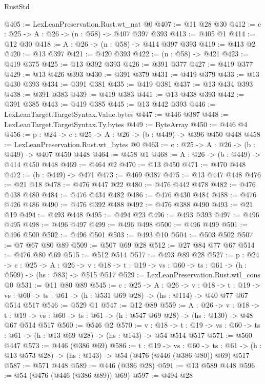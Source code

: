 \begin{lexlean}{RustStd}
\begin{coremodule}
{\begin{coremodule}
{{{{{{{{{{{{{{{{{{{{{{{{{{{{{{{{{{{{{{@405 := LexLeanPreservation.Rust.wt_nat @0
@407 := @11 @28 @30
@412 := {c : @25} -> {A : @26} -> (n : @58) -> @407 @397 @393
@413 := @405 @1
@414 := @12 @30
@418 := {A : @26} -> (n : @58) -> @414 @397 @393
@419 := @413 @2
@420 := @13 @397
@421 := @420 @393
@422 := (n : @58) -> @421
@423 := @419 @375
@425 := @13 @392 @393
@426 := @391 @377
@427 := @419 @377
@429 := @13 @426 @393
@430 := @391 @379
@431 := @419 @379
@433 := @13 @430 @393
@434 := @391 @381
@435 := @419 @381
@437 := @13 @434 @393
@438 := @391 @383
@439 := @419 @383
@441 := @13 @438 @393
@442 := @391 @385
@443 := @419 @385
@445 := @13 @442 @393
@446 := LexLeanTarget.TargetSyntax.Value.bytes
@447 := @446 @387
@448 := LexLeanTarget.TargetSyntax.Ty.bytes
@449 := ByteArray
@450 := @446 @4
@456 := {p : @24} -> {c : @25} -> {A : @26} -> (b : @449) -> @396 @450 @448
@458 := LexLeanPreservation.Rust.wt_bytes @0
@463 := {c : @25} -> {A : @26} -> (b : @449) -> @407 @450 @448
@464 := @458 @1
@468 := {A : @26} -> (b : @449) -> @414 @450 @448
@469 := @464 @2
@470 := @13 @450
@471 := @470 @448
@472 := (b : @449) -> @471
@473 := @469 @387
@475 := @13 @447 @448
@476 := @21 @18
@478 := @476 @447 @22
@480 := @476 @442 @478
@482 := @476 @438 @480
@484 := @476 @434 @482
@486 := @476 @430 @484
@488 := @476 @426 @486
@490 := @476 @392 @488
@492 := @476 @388 @490
@493 := @21 @19
@494 := @493 @448
@495 := @494 @23
@496 := @493 @393
@497 := @496 @495
@498 := @496 @497
@499 := @496 @498
@500 := @496 @499
@501 := @496 @500
@502 := @496 @501
@503 := @493 @10
@504 := @503 @502
@507 := @7 @67 @80 @89
@509 := @507 @69 @28
@512 := @27 @84 @77 @67
@514 := @476 @80 @69
@515 := @512 @514
@517 := @493 @89 @28
@527 := {p : @24} ->
  {c : @25} ->
  {A : @26} ->
  {v : @18} -> {t : @19} -> {vs : @60} -> {ts : @61} -> (h : @509) -> (hs : @83) -> @515 @517
@529 := LexLeanPreservation.Rust.wtl_cons @0
@531 := @11 @80 @89
@545 := {c : @25} ->
  {A : @26} ->
  {v : @18} ->
  {t : @19} ->
  {vs : @60} -> {ts : @61} -> (h : @531 @69 @28) -> (hs : @114) -> @40 @77 @67 @514 @517
@546 := @529 @1
@547 := @12 @89
@559 := {A : @26} ->
  {v : @18} ->
  {t : @19} -> {vs : @60} -> {ts : @61} -> (h : @547 @69 @28) -> (hs : @130) -> @48 @67 @514 @517
@560 := @546 @2
@570 := {v : @18} ->
  {t : @19} -> {vs : @60} -> {ts : @61} -> (h : @13 @69 @28) -> (hs : @143) -> @54 @514 @517
@571 := @560 @447
@573 := @446 (@386 @69)
@586 := {t : @19} ->
  {vs : @60} ->
  {ts : @61} -> (h : @13 @573 @28) -> (hs : @143) -> @54 (@476 (@446 (@386 @80)) @69) @517
@587 := @571 @448
@589 := @446 (@386 @28)
@591 := @13 @589 @448
@596 := @54 (@476 (@446 (@386 @89)) @69)
@597 := @494 @28
}}}}}}}}}}}}}}}}}}}}}}}}}}}}}}}}}}}}}}
\end{coremodule}}
\end{coremodule}
\end{lexlean}
